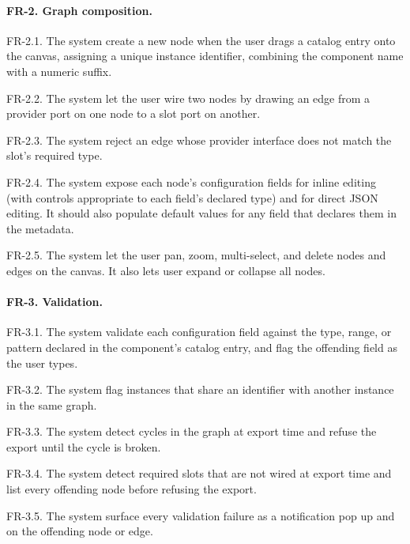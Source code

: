 \paragraph{FR-2. Graph composition.}
\begin{reqlist}
    \item[FR-2.1.] The system create a new node when the user drags a catalog entry onto the canvas, assigning a unique instance identifier, combining the component name with a numeric suffix.
    \item[FR-2.2.] The system let the user wire two nodes by drawing an edge from a provider port on one node to a slot port on another.
    \item[FR-2.3.] The system reject an edge whose provider interface does not match the slot's required type.
    \item[FR-2.4.] The system expose each node's configuration fields for inline editing (with controls appropriate to each field's declared type) and for direct JSON editing. It should also populate default values for any field that declares them in the metadata.
    \item[FR-2.5.] The system let the user pan, zoom, multi-select, and delete nodes and edges on the canvas. It also lets user expand or collapse all nodes.
\end{reqlist}

\paragraph{FR-3. Validation.}
\begin{reqlist}
    \item[FR-3.1.] The system validate each configuration field against the type, range, or pattern declared in the component's catalog entry, and flag the offending field as the user types.
    \item[FR-3.2.] The system flag instances that share an identifier with another instance in the same graph.
    \item[FR-3.3.] The system detect cycles in the graph at export time and refuse the export until the cycle is broken.
    \item[FR-3.4.] The system detect required slots that are not wired at export time and list every offending node before refusing the export.
    \item[FR-3.5.] The system surface every validation failure as a notification pop up and on the offending node or edge.
\end{reqlist}

